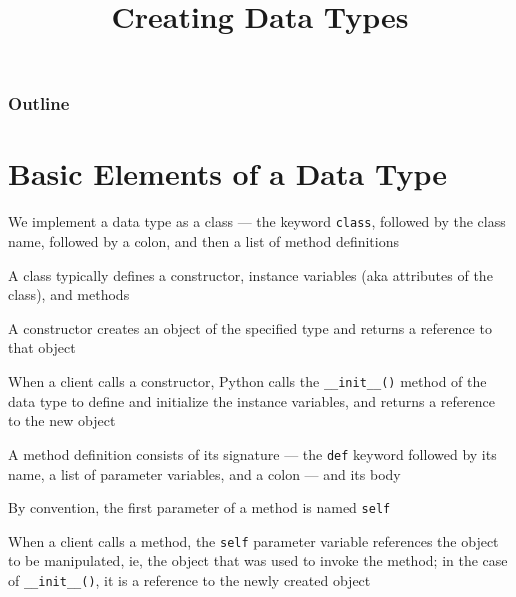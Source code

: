 \documentclass[8pt,a4paper,compress]{beamer}
\title{Creating Data Types}
\date{}
\begin{document}
\begin{frame}
\vfill
\titlepage
\end{frame}

\begin{frame}
\frametitle{Outline}
\tableofcontents
\end{frame}

\section{Basic Elements of a Data Type}
\begin{frame}[fragile]
\pause

We implement a data type as a class --- the keyword \lstinline{class}, followed by the class name, followed by a colon, and then a list of method definitions

\pause
\bigskip

A class typically defines a constructor, instance variables (aka attributes of the class), and methods

\pause
\bigskip

A constructor creates an object of the specified type and returns a reference to that object

\pause
\bigskip

When a client calls a constructor, Python calls the \lstinline{__init__()} method of the data type to define and initialize the instance variables, and returns a reference to the new object

\pause
\bigskip

A method definition consists of its signature --- the \lstinline{def} keyword followed by its name, a list of parameter variables, and a colon --- and its body

\pause
\bigskip

By convention, the first parameter of a method is named \lstinline{self}

\pause
\bigskip

When a client calls a method, the \lstinline{self} parameter variable references the object to be manipulated, ie, the object that was used to invoke the method; in the case of \lstinline{__init__()}, it is a reference to the newly created object
\end{frame}
\end{document}
